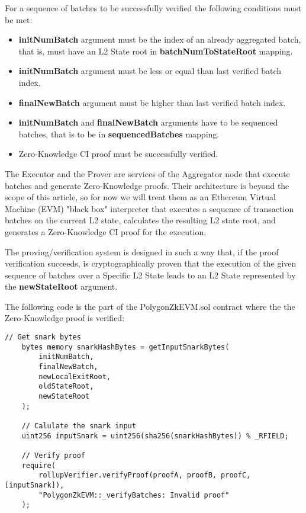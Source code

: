 For a sequence of batches to be successfully verified the following conditions must be met:

\begin{itemize}
	\item \textbf{initNumBatch} argument must be the index of an already aggregated batch, that is, must have an L2 State root in \textbf{batchNumToStateRoot} mapping.
	\item \textbf{initNumBatch} argument must be less or equal than last verified batch index.
	\item \textbf{finalNewBatch} argument must be higher than last verified batch index.
	\item \textbf{initNumBatch} and \textbf{finalNewBatch} arguments have to be sequenced batches, that is to be in \textbf{sequencedBatches} mapping.
	\item Zero-Knowledge CI proof must be successfully verified.
\end{itemize}


The Executor and the Prover are services of the Aggregator node that execute batches and generate Zero-Knowledge proofs. Their architecture is beyond the scope of this article, so for now we will treat them as an Ethereum Virtual Machine (EVM) "black box" interpreter that executes a sequence of transaction batches on the current L2 state, calculates the resulting L2 state root, and generates a Zero-Knowledge CI proof for the execution.

The proving/verification system is designed in such a way that, if the proof verification succeeds, is cryptographically proven that the execution of the given sequence of batches over a Specific L2 State leads to an L2 State represented by the \textbf{newStateRoot} argument.


The following code is the part of the PolygonZkEVM.sol contract where the the Zero-Knowledge proof is verified:

\begin{lstlisting}[language=Solidity]
	// Get snark bytes
	bytes memory snarkHashBytes = getInputSnarkBytes(
		initNumBatch,
		finalNewBatch,
		newLocalExitRoot,
		oldStateRoot,
		newStateRoot
	);
	
	// Calulate the snark input
	uint256 inputSnark = uint256(sha256(snarkHashBytes)) % _RFIELD;
	
	// Verify proof
	require(
		rollupVerifier.verifyProof(proofA, proofB, proofC, [inputSnark]),
		"PolygonZkEVM::_verifyBatches: Invalid proof"
	);

\end{lstlisting}

